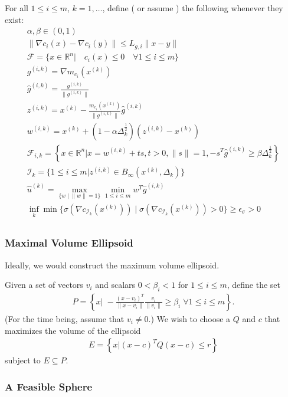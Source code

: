 \documentclass{article}
\theoremstyle{case}
\newcommand{\dk}{\Delta_k}
\newcommand{\xk}{{x^{(k)}}}
\newcommand{\gik}{{g^{(i, k)}}}
\newcommand{\hgik}{{{\hat g}^{(i, k)}}}
\newcommand{\zik}{{z^{(i, k)}}}
\newcommand{\fik}{{\mathcal F_{i, k}}}
\newcommand{\iik}{{\mathcal I_{k}}}
\newcommand{\huk}{{{\hat u}^{(k)}}}
\newcommand{\rn}{{\mathbb R^{n}}}
\newcommand{\wik}{{w^{(i, k)}}}
\newcommand{\f}{{\mathcal F}}
\newcommand{\lgi}{{L_{g, i}}}
\begin{document}
For all $1 \le i \le m$, $k = 1, \ldots$, define (\color{red} or assume \color{black}) the following whenever they exist:
\begin{align}
\alpha, \beta \in (0, 1) \label{def_alpha_beta} \\
\|\nabla c_i(x) - \nabla c_i(y)\| \le \lgi \|x - y\| \label{def_lipshitz} \\
\f = \{x \in \rn | \quad c_i(x) \le 0\quad \forall 1 \le i \le m \} \label{def_feasible} \\
\gik = \nabla m_{c_i}(\xk) \label{def_g} \\
\hgik = \frac{\gik}{\|\gik\|} \label{def_gk} \\
\zik = \xk - \frac{m_{c_i}(\xk)}{\|\gik\|}\hgik \label{def_z} \\
\wik = \xk + \left(1 - \alpha\dk^{\frac 1 2}\right)\left(\zik - \xk\right) \label{def_w} \\
\fik = \left\{x \in \rn | x = \wik + t s,t > 0, \|s\| = 1, -s^T\hgik \ge \beta \dk^{\frac 1 2 }\right\} \label{def_f} \\
\iik = \{1\le i \le m | \zik \in B_{\infty}(\xk, \dk) \} \label{def_i} \\
\huk = \max_{\{w \; | \; \|w\| = 1\}} \min_{1\le i\le m} w^T \hgik\label{def_hu} \\
\inf_{k}\min\{\sigma(\nabla c_{\mathcal I_k}(\xk)) \; | \; \sigma(\nabla c_{\mathcal I_k}(\xk)) > 0 \} \ge \epsilon_{\sigma} > 0\\
\end{align}


\subsubsection{Maximal Volume Ellipsoid}

Ideally, we would construct the maximum volume ellipsoid.


Given a set of vectors $v_i$ and scalars $0 < \beta_i < 1$ for $1\le i\le m$, define the set
\begin{align*}
P = \left\{x\bigg|\;-\frac{(x - v_i)^T}{\|x - v_i\|} \frac{v_i}{\|v_i\|} \ge \beta_i \; \forall 1 \le i \le m\right\}.
\end{align*}
(For the time being, assume that $v_i \ne 0$.)
We wish to choose a $Q$ and $c$ that maximizes the volume of the ellipsoid
\begin{align*}
E = \left\{x | (x - c)^TQ(x - c) \le r \right\}
\end{align*}
subject to $E \subseteq P$.


\subsubsection{A Feasible Sphere}
\end{document}
